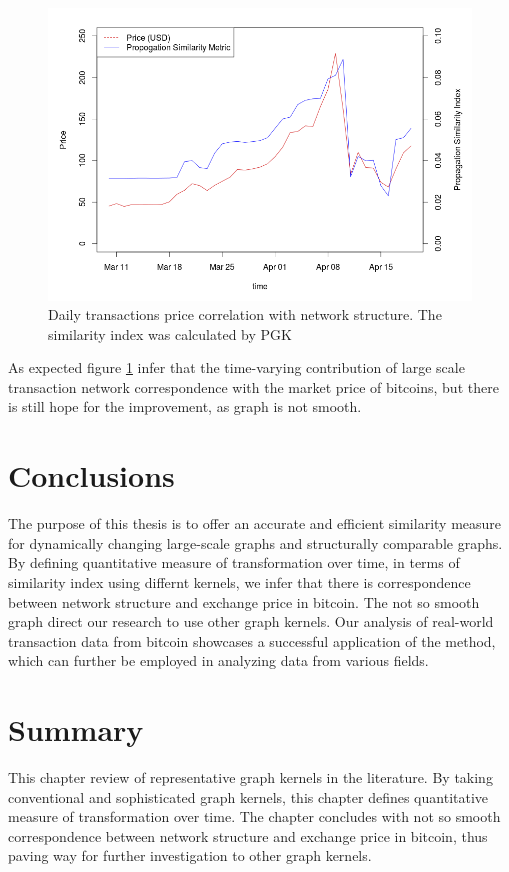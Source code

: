 \begin{figure}[ht]
\begin{center}
\includegraphics[width=\textwidth]{./Figures/PGK.png}
\caption{Daily transactions price correlation with network structure. The similarity index was calculated by PGK }
\label{fig:PGK}
\end{center}
\end{figure}

As expected figure \ref{fig:PGK} infer that the time-varying contribution of large scale transaction network correspondence with the market price of bitcoins, but there is still hope for the improvement, as graph is not smooth.
 

\section{Conclusions}

The purpose of this thesis is to offer an accurate and efficient similarity measure for dynamically changing large-scale graphs and structurally comparable graphs. By defining quantitative measure of transformation over time, in terms of similarity index using differnt kernels, we infer that there is correspondence between network structure and exchange price in bitcoin. The not so smooth graph direct our research to use other graph kernels. Our analysis of real-world transaction data from bitcoin  showcases a successful application of the method, which can further be employed in analyzing data from various fields.

\section{Summary}
This chapter review of representative graph kernels in the literature. By taking conventional and sophisticated graph kernels, this chapter defines   quantitative measure of transformation over time. The chapter concludes with not so smooth correspondence between network structure and exchange price in bitcoin, thus paving way for further investigation to other graph kernels.
